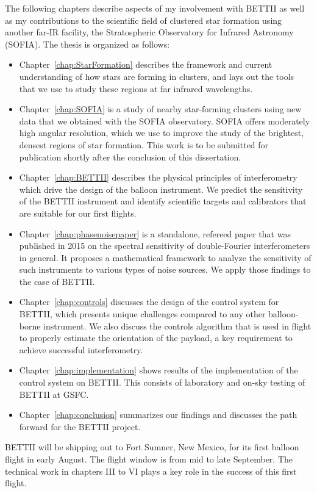 The following chapters describe aspects of my involvement with BETTII as well as my contributions to the scientific field of clustered star formation using another far-IR facility, the Stratospheric Observatory for Infrared Astronomy (SOFIA). The thesis is organized as follows:
\begin{itemize}
\item Chapter~\ref{chap:StarFormation} describes the framework and current understanding of how stars are forming in clusters, and lays out the tools that we use to study these regions at far infrared wavelengths.
\item Chapter~\ref{chap:SOFIA} is a study of nearby star-forming clusters using new data that we obtained with the SOFIA observatory. SOFIA offers moderately high angular resolution, which we use to improve the study of the brightest, densest regions of star formation. This work is to be submitted for publication shortly after the conclusion of this dissertation. 
\item Chapter~\ref{chap:BETTII} describes the physical principles of interferometry which drive the design of the balloon instrument. We predict the sensitivity of the BETTII instrument and identify scientific targets and calibrators that are suitable for our first flights.
\item Chapter~\ref{chap:phasenoisepaper} is a standalone, refereed paper that was published in 2015 on the spectral sensitivity of double-Fourier interferometers in general. It proposes a mathematical framework to analyze the sensitivity of such instruments to various types of noise sources. We apply those findings to the case of BETTII.
\item Chapter~\ref{chap:controls} discusses the design of the control system for BETTII, which presents unique challenges compared to any other balloon-borne instrument. We also discuss the controls algorithm that is used in flight to properly estimate the orientation of the payload, a key requirement to achieve successful interferometry.
\item Chapter~\ref{chap:implementation} shows results of the implementation of the control system on BETTII. This consists of laboratory and on-sky testing of BETTII at GSFC.
\item Chapter~\ref{chap:conclusion} summarizes our findings and discusses the path forward for the BETTII project.
\end{itemize}

BETTII will be shipping out to Fort Sumner, New Mexico, for its first balloon flight in early August. The flight window is from mid to late September. The technical work in chapters III to VI plays a key role in the success of this first flight.

